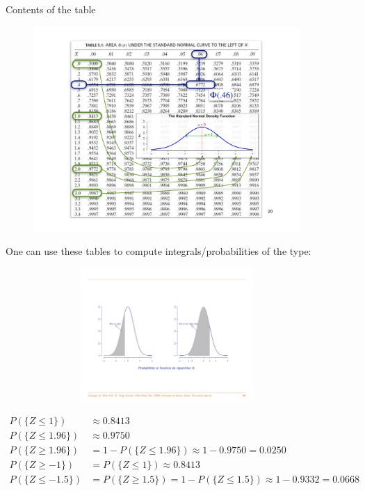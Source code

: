 \documentclass[smaller]{beamer}\usepackage[]{graphicx}\usepackage[]{color}
\begin{document}
\begin{frame}{\secname}
Contents of the table
  \begin{figure}[ptb]\centering
  \includegraphics[width=0.9\textwidth,height=0.95\textheight]{img/myTableGauss.pdf}
  \end{figure}
\end{frame}

\begin{frame}{\secname}
  One can use these tables to compute integrals/probabilities of the type:
  \begin{figure}[ptb]\centering
  \includegraphics[height=2in, width=4in]{img/CDF_pr.pdf}%
  \end{figure}
\end{frame}

\begin{frame}{\secname}

\begin{example}[Prob of $Z$]
\begin{footnotesize}
  \begin{align*}
  P(\{Z\leq 1\})& \approx0.8413 \\[0.4em]
  P(\{Z\leq 1.96\})& \approx0.9750 \\[0.4em]
  P(\{Z\geq 1.96\})& =1-P(\{Z\leq 1.96\}) \approx 1-0.9750=0.0250 \\[0.4em]
  P(\{Z\geq -1\})& =P(\{Z\leq 1\})\approx 0.8413  \\[0.4em]
  P(\{Z\leq -1.5\})& =P(\{Z\geq 1.5\}) =1-P(\{Z\leq 1.5\}) \approx 1-0.9332=0.0668
  \end{align*}
  \end{footnotesize}
  \end{example}
\end{frame}%
\end{document}
